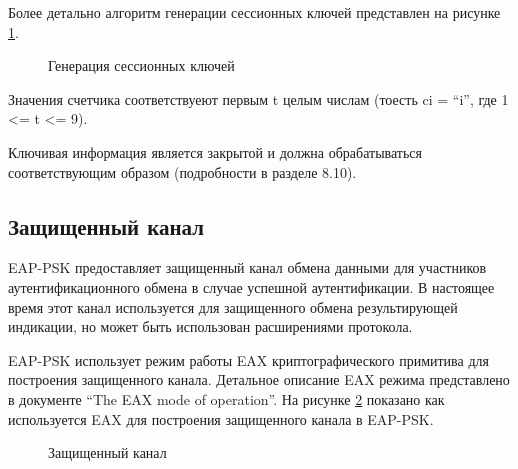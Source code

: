 Более детально алгоритм генерации сессионных ключей представлен на рисунке \ref{img:sk_derivation2}.

\begin{figure}[h!]
\caption{Генерация сессионных ключей}
\label{img:sk_derivation2}
\end{figure}

Значения счетчика соответствуеют первым t целым числам (тоесть ci = ``i'', где 1 <= t <= 9).

Ключивая информация является закрытой и должна обрабатываться соответствующим образом (подробности в разделе 8.10).

\subsection{Защищенный канал}

EAP-PSK предоставляет защищенный канал обмена данными для участников аутентификационного обмена в случае успешной аутентификации. В настоящее время этот канал используется для защищенного обмена результирующей индикации, но может быть использован расширениями протокола.

EAP-PSK использует режим работы EAX криптографического примитива для построения защищенного канала. Детальное описание EAX режима представлено в документе ``The EAX mode of operation''. На рисунке \ref{img:protected_channel} показано как используется EAX для построения защищенного канала в EAP-PSK.

\begin{figure}[h!]
\caption{Защищенный канал}
\label{img:protected_channel}
\end{figure}



